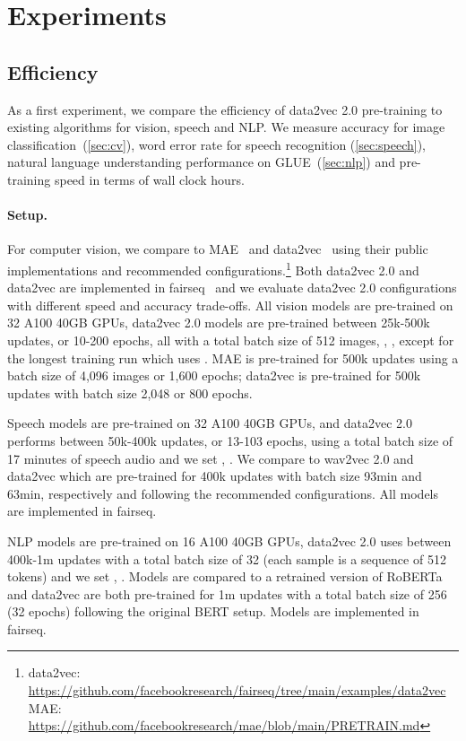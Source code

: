 \documentclass[nohyperref]{article}
\theoremstyle{plain}
\theoremstyle{definition}
\theoremstyle{remark}
\newcommand{\name}{data2vec 2.0}
\begin{document}
\section{Experiments}
\label{sec:results}


\subsection{Efficiency}

As a first experiment, we compare the efficiency of \name{} pre-training to existing algorithms for vision, speech and NLP. 
We measure accuracy for image classification~(\textsection\ref{sec:cv}), word error rate for speech recognition (\textsection\ref{sec:speech}), natural language understanding performance on GLUE~(\textsection\ref{sec:nlp}) and pre-training speed in terms of wall clock hours.

\paragraph{Setup.}
For computer vision, we compare to MAE~\citep{he2021mae} and data2vec~\citep{baevski2020wav} using their public implementations and recommended configurations.\footnote{data2vec: {\scriptsize\url{https://github.com/facebookresearch/fairseq/tree/main/examples/data2vec}} MAE: {\scriptsize\url{https://github.com/facebookresearch/mae/blob/main/PRETRAIN.md}}
}
Both \name{} and data2vec are implemented in fairseq~\citep{ott2019fairseq} and we evaluate \name{} configurations with different speed and accuracy trade-offs.
All vision models are pre-trained on 32 A100 40GB GPUs, \name{} models are pre-trained between 25k-500k updates, or 10-200 epochs, all with a total batch size of 512 images, , , except for the longest training run which uses .
MAE is pre-trained for 500k updates using a batch size of 4,096 images or 1,600 epochs; data2vec is pre-trained for 500k updates with batch size 2,048 or 800 epochs.

Speech models are pre-trained on 32 A100 40GB GPUs, and \name{} performs between 50k-400k updates, or 13-103 epochs, using a total batch size of 17 minutes of speech audio and we set , . 
We compare to wav2vec 2.0 and data2vec which are pre-trained for 400k updates with batch size 93min and 63min, respectively and following the recommended configurations. 
All models are implemented in fairseq.

NLP models are pre-trained on 16 A100 40GB GPUs, \name{} uses between 400k-1m updates with a total batch size of 32 (each sample is a sequence of 512 tokens) and we set , .
Models are compared to a retrained version of RoBERTa and data2vec are both pre-trained for 1m updates with a total batch size of 256 (32 epochs) following the original BERT setup.
Models are implemented in fairseq.
\end{document}
